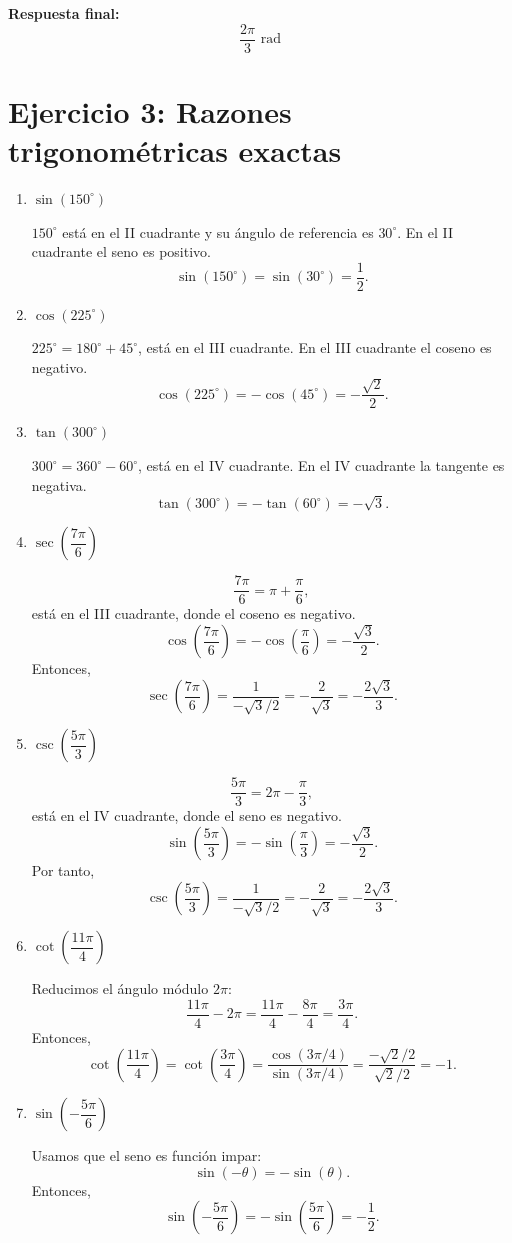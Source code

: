 \documentclass[12pt]{article}
\begin{document}
	\textbf{Respuesta final:}
	\[
	\boxed{\frac{2\pi}{3}\text{ rad}}
	\]
	
	\section*{Ejercicio 3: Razones trigonométricas exactas}
	
	\begin{enumerate}[label=\arabic*)]
		\item \(\sin(150^\circ)\)
		
		\(150^\circ\) está en el II cuadrante y su ángulo de referencia es \(30^\circ\). En el II cuadrante el seno es positivo.
		\[
		\sin(150^\circ)=\sin(30^\circ)=\frac{1}{2}.
		\]
		
		\item \(\cos(225^\circ)\)
		
		\(225^\circ=180^\circ+45^\circ\), está en el III cuadrante. En el III cuadrante el coseno es negativo.
		\[
		\cos(225^\circ)=-\cos(45^\circ)=-\frac{\sqrt{2}}{2}.
		\]
		
		\item \(\tan(300^\circ)\)
		
		\(300^\circ=360^\circ-60^\circ\), está en el IV cuadrante. En el IV cuadrante la tangente es negativa.
		\[
		\tan(300^\circ)=-\tan(60^\circ)=-\sqrt{3}.
		\]
		
		\item \(\sec\left(\dfrac{7\pi}{6}\right)\)
		
		\[
		\frac{7\pi}{6}=\pi+\frac{\pi}{6},
		\]
		está en el III cuadrante, donde el coseno es negativo.
		\[
		\cos\left(\frac{7\pi}{6}\right)=-\cos\left(\frac{\pi}{6}\right)=-\frac{\sqrt{3}}{2}.
		\]
		Entonces,
		\[
		\sec\left(\frac{7\pi}{6}\right)=\frac{1}{-\sqrt{3}/2}=-\frac{2}{\sqrt{3}}=-\frac{2\sqrt{3}}{3}.
		\]
		
		\item \(\csc\left(\dfrac{5\pi}{3}\right)\)
		
		\[
		\frac{5\pi}{3}=2\pi-\frac{\pi}{3},
		\]
		está en el IV cuadrante, donde el seno es negativo.
		\[
		\sin\left(\frac{5\pi}{3}\right)=-\sin\left(\frac{\pi}{3}\right)=-\frac{\sqrt{3}}{2}.
		\]
		Por tanto,
		\[
		\csc\left(\frac{5\pi}{3}\right)=\frac{1}{-\sqrt{3}/2}=-\frac{2}{\sqrt{3}}=-\frac{2\sqrt{3}}{3}.
		\]
		
		\item \(\cot\left(\dfrac{11\pi}{4}\right)\)
		
		Reducimos el ángulo módulo \(2\pi\):
		\[
		\frac{11\pi}{4}-2\pi=\frac{11\pi}{4}-\frac{8\pi}{4}=\frac{3\pi}{4}.
		\]
		Entonces,
		\[
		\cot\left(\frac{11\pi}{4}\right)=\cot\left(\frac{3\pi}{4}\right)=\frac{\cos(3\pi/4)}{\sin(3\pi/4)}=\frac{-\sqrt{2}/2}{\sqrt{2}/2}=-1.
		\]
		
		\item \(\sin\left(-\dfrac{5\pi}{6}\right)\)
		
		Usamos que el seno es función impar:
		\[
		\sin(-\theta)=-\sin(\theta).
		\]
		Entonces,
		\[
		\sin\left(-\frac{5\pi}{6}\right)=-\sin\left(\frac{5\pi}{6}\right)=-\frac{1}{2}.
		\]
	\end{enumerate}
	
\end{document}
